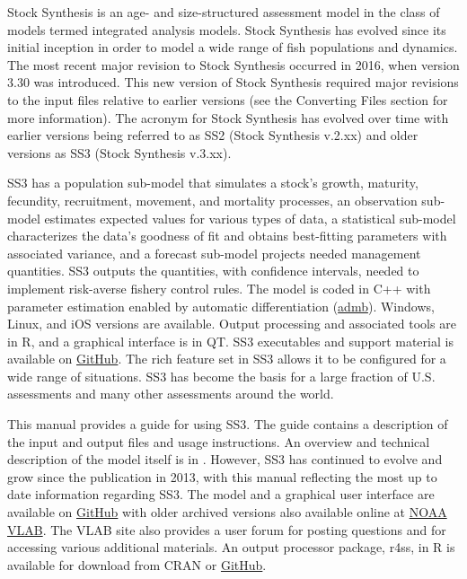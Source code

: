 Stock Synthesis is an age- and size-structured assessment model in the class of models termed integrated analysis models. Stock Synthesis has evolved since its initial inception in order to model a wide range of fish populations and dynamics. The most recent major revision to Stock Synthesis occurred in 2016, when version 3.30 was introduced. This new version of Stock Synthesis required major revisions to the input files relative to earlier versions (see the \hypertarget{ConvIssues}{Converting Files} section for more information). The acronym for Stock Synthesis has evolved over time with earlier versions being referred to as SS2 (Stock Synthesis v.2.xx) and older versions as SS3 (Stock Synthesis v.3.xx). 

SS3 has a population sub-model that simulates a stock's growth, maturity, fecundity, recruitment, movement, and mortality processes, an observation sub-model estimates expected values for various types of data, a statistical sub-model characterizes the data's goodness of fit and obtains best-fitting parameters with associated variance, and a forecast sub-model projects needed management quantities. SS3 outputs the quantities, with confidence intervals, needed to implement risk-averse fishery control rules. The model is coded in C++ with parameter estimation enabled by automatic differentiation (\href{http://www.admb-project.org}{admb}). Windows, Linux, and iOS versions are available. Output processing and associated tools are in R, and a graphical interface is in QT. SS3 executables and support material is available on \href{https://github.com/nmfs-stock-synthesis}{GitHub}. The rich feature set in SS3 allows it to be configured for a wide range of situations. SS3 has become the basis for a large fraction of U.S. assessments and many other assessments around the world.  

This manual provides a guide for using SS3. The guide contains a description of the input and output files and usage instructions. An overview and technical description of the model itself is in \citet{methotstock2013}. However, SS3 has continued to evolve and grow since the publication in 2013, with this manual reflecting the most up to date information regarding SS3. The model and a graphical user interface are available on \href{https://github.com/nmfs-stock-synthesis}{GitHub} with older archived versions also available online at \href{https://vlab.noaa.gov/web/stock-synthesis}{NOAA VLAB}. The VLAB site also provides a user forum for posting questions and for accessing various additional materials. An output processor package, r4ss, in R is available for download from CRAN or \href{https://github.com/r4ss/r4ss}{GitHub}.


